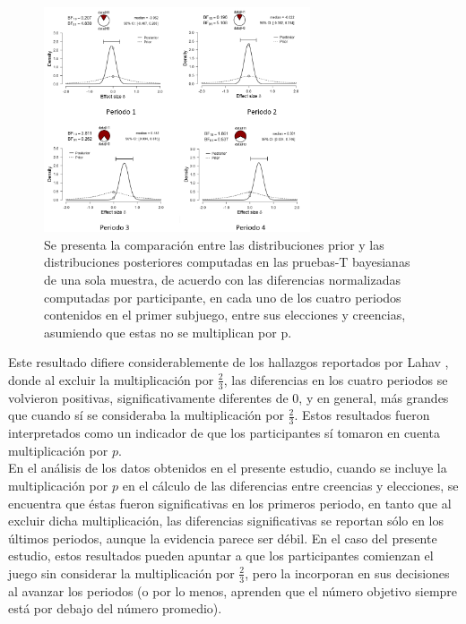 \begin{figure}[th]
\centering
\includegraphics[width=0.70\textwidth]{Figures/Fig_2} 
\caption[Distribuciones prior y posterior de las Diferencias Normalizadas en el primer Subjuego, (prueba T bayesiana de una muestra), sin incluir la multiplicación por $p$]{Se presenta la comparación entre las distribuciones prior y las distribuciones posteriores computadas en las pruebas-T bayesianas de una sola muestra, de acuerdo con las diferencias normalizadas computadas por participante, en cada uno de los cuatro periodos contenidos en el primer subjuego, entre sus elecciones y creencias, asumiendo que estas no se multiplican por p.}
\label{fig:DiferenciasNormalizadas_Subjuego1_NoP}
\end{figure}

Este resultado difiere considerablemente de los hallazgos reportados por Lahav \parencite*{Lahav2015}, donde al excluir la multiplicación por $\frac{2}{3}$, las diferencias en los cuatro periodos se volvieron positivas, significativamente diferentes de $0$, y en general,  más grandes que cuando sí se consideraba la multiplicación por $\frac{2}{3}$. Estos resultados fueron interpretados como un indicador de que los participantes sí tomaron en cuenta multiplicación por $p$.\\

En el análisis de los datos obtenidos en el presente estudio, cuando se incluye la multiplicación por $p$ en el cálculo de las diferencias entre creencias y elecciones, se encuentra que éstas fueron significativas en los primeros periodo, en tanto que  al excluir dicha multiplicación, las diferencias significativas se reportan sólo en los últimos periodos, aunque la evidencia parece ser débil. En el caso del presente estudio, estos resultados pueden apuntar a que los participantes comienzan el juego sin considerar la multiplicación por $\frac{2}{3}$, pero la incorporan en sus decisiones al avanzar los periodos (o por lo menos, aprenden que el número objetivo siempre está por debajo del número promedio).\\

